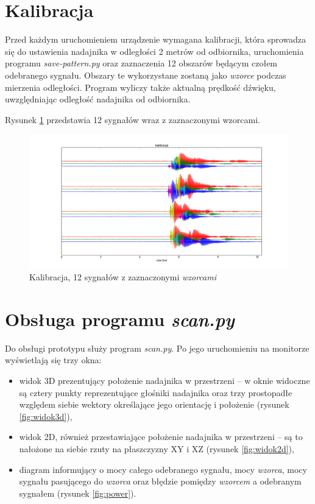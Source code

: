 \section{Kalibracja}

Przed każdym uruchomieniem urządzenie wymagana kalibracji,
która sprowadza się do ustawienia nadajnika w odległości 2 metrów od odbiornika,
uruchomienia programu \textit{save-pattern.py} oraz zaznaczenia  12 obszarów  będącym czołem odebranego sygnału.
Obszary te wykorzystane zostaną jako \textit{wzorce} podczas mierzenia odległości.
Program wyliczy także aktualną prędkość dźwięku, uwzględniając odległość nadajnika od odbiornika.

Rysunek \ref{fig:kalibracja_12x} przedstawia 12 sygnałów wraz z zaznaczonymi wzorcami.


 \begin{figure}[h!]
    \centering
    \includegraphics[width=1.13\textwidth, trim= 53mm 0mm 0mm 0mm,clip]{kalibracja_12x}
    \caption{Kalibracja, 12 sygnałów z zaznaczonymi \textit{wzorcami}}
    \label{fig:kalibracja_12x}
\end{figure}

\newpage

\section{Obsługa programu \textit{scan.py}}

Do obsługi prototypu służy program \textit{scan.py}. Po jego uruchomieniu 
na monitorze wyświetlają się trzy okna: 
\begin{itemize}
 \item widok 3D prezentujący położenie nadajnika w przestrzeni -- w oknie widoczne są  
 cztery punkty reprezentujące głośniki nadajnika oraz trzy prostopadłe względem siebie wektory określające 
jego orientację i położenie (rysunek \ref{fig:widok3d}),
 \item widok 2D, również przestawiające położenie nadajnika w przestrzeni --
 są to nałożone na siebie rzuty na płaszczyzny XY i XZ
 (rysunek \ref{fig:widok2d}),
 \item diagram informujący o mocy całego odebranego sygnału, mocy \textit{wzorca}, mocy sygnału pasującego do \textit{wzorca} 
 oraz błędzie pomiędzy \textit{wzorcem} a odebranym sygnałem (rysunek \ref{fig:power}).
\end{itemize}

